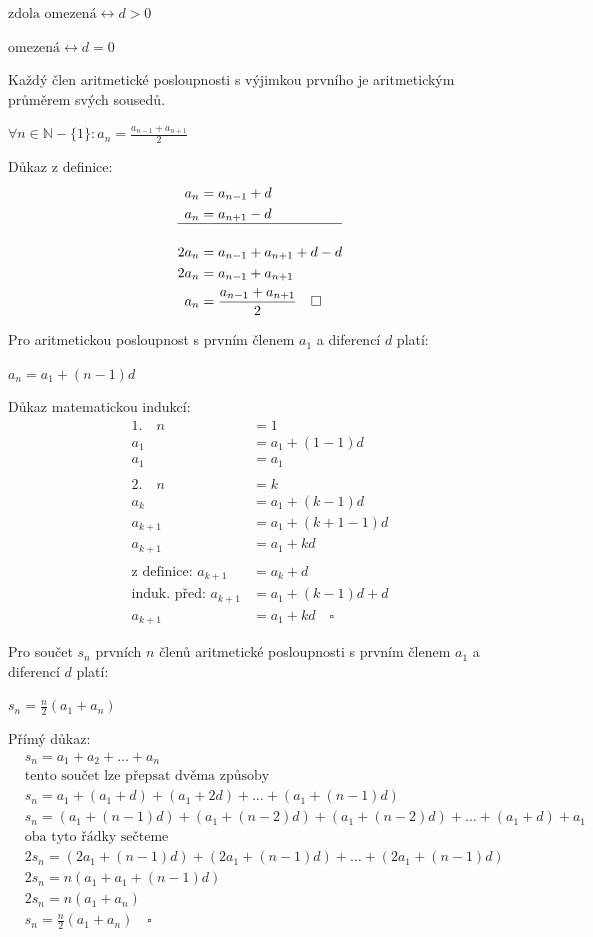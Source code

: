 \documentclass[12pt]{article}
\begin{document}
$\text{zdola omezená} \leftrightarrow d > 0$

$\text{omezená} \leftrightarrow d = 0$

Každý člen aritmetické posloupnosti s výjimkou prvního je aritmetickým průměrem svých sousedů.

$\forall n \in \mathbb{N} - \{1\} : a_n = \frac{a_{n-1} + a_{n+1}}{2}$

Důkaz z definice:
\[
\begin{align*}
    a_n &= a_{n-1} + d \\
    a_n &= a_{n+1} - d \\ \hline \\
    2a_n &= a_{n-1} + a_{n+1} + d - d \\
    2a_n &= a_{n-1} + a_{n+1} \\
    a_n &= \frac{a_{n-1} + a_{n+1}}{2} \quad \square
\end{align*}
\]

Pro aritmetickou posloupnost s prvním členem $a_1$ a diferencí $d$ platí:

$a_n = a_1 + (n-1)d$

Důkaz matematickou indukcí:
\[
\begin{align*}
    1. \quad n &= 1 \\
    a_1 &= a_1 + (1-1)d \\
    a_1 &= a_1 \\\\
    2. \quad n &= k \\
    a_k &= a_1 + (k-1)d \\
    a_{k+1} &= a_1 + (k+1-1)d \\
    a_{k+1} &= a_1 + kd \\\\
    \text{z definice: } a_{k+1} &= a_k + d \\
    \text{induk. před: } a_{k+1} &= a_1 + (k-1)d + d \\
    a_{k+1} &= a_1 + kd \quad \square
\end{align*}
\]

Pro součet $s_n$ prvních $n$ členů aritmetické posloupnosti s prvním členem $a_1$ a diferencí $d$
platí:

$s_n = \frac{n}{2}(a_1 + a_n)$

Přímý důkaz:
\[
\begin{align*}
    &s_n = a_1 + a_2 + \dots + a_n \\
    &\text{tento součet lze přepsat dvěma způsoby} \\
    &s_n = a_1 + (a_1 + d) + (a_1 + 2d) + \dots + (a_1 + (n-1)d) \\
    &s_n = (a_1 + (n-1)d) + (a_1 + (n-2)d) + (a_1 + (n-2)d) + \dots + (a_1 + d) + a_1 \\
    &\text{oba tyto řádky sečteme} \\
    &2s_n = (2a_1 + (n-1)d) + (2a_1 + (n-1)d) + \dots + (2a_1 + (n-1)d) \\
    &2s_n = n(a_1 + a_1 + (n-1)d) \\
    &2s_n = n(a_1 + a_n) \\
    &s_n = \frac{n}{2}(a_1 + a_n) \quad \square
\end{align*}
\]
\end{document}

